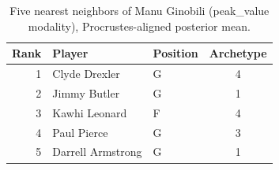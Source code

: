 \begin{table}[htbp]
  \centering\small
  \begin{tabular}{rllc}
    \toprule
    Rank & Player & Position & Archetype \\
    \midrule
    1 & Clyde Drexler & G & 4 \\
    2 & Jimmy Butler & G & 1 \\
    3 & Kawhi Leonard & F & 4 \\
    4 & Paul Pierce & G & 3 \\
    5 & Darrell Armstrong & G & 1 \\
    \bottomrule
  \end{tabular}
  \caption{Five nearest neighbors of Manu Ginobili (peak_value modality), Procrustes-aligned posterior mean.}
  \label{tab:Manu_Ginobili_neighbors_peak_value}
\end{table}

